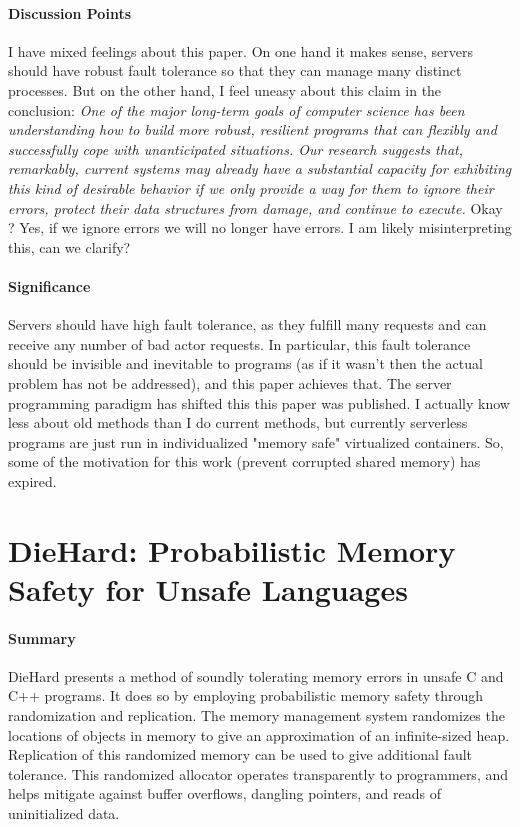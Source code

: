\paragraph{\textbf{Discussion Points}}
I have mixed feelings about this paper. On one hand it makes sense, servers
should have robust fault tolerance so that they can manage many distinct
processes. But on the other hand, I feel uneasy about this claim in the
conclusion:
\textit{One of the major long-term goals of computer science has been
understanding how to build more robust, resilient programs that can flexibly and
successfully cope with unanticipated situations. Our research suggests that,
remarkably, current systems may already have a substantial capacity for
exhibiting this kind of desirable behavior if we only provide a way for them to
ignore their errors, protect their data structures from damage, and continue
to execute.}
Okay ? Yes, if we ignore errors we will no longer have errors. I am likely
misinterpreting this, can we clarify?

\paragraph{\textbf{Significance}}
Servers should have high fault tolerance, as they fulfill many requests and can
receive any number of bad actor requests. In particular, this fault tolerance
should be invisible and inevitable to programs (as if it wasn't then the actual
problem has not be addressed), and this paper achieves that. The server
programming paradigm has shifted this this paper was published. I actually know
less about old methods than I do current methods, but currently serverless
programs are just run in individualized "memory safe" virtualized containers.
So, some of the motivation for this work (prevent corrupted shared memory) has
expired.

\section {DieHard: Probabilistic Memory Safety for Unsafe Languages \cite{berger2006diehard}}

\paragraph{\textbf{Summary}}
DieHard presents a method of soundly tolerating memory errors in unsafe C and
C++ programs. It does so by employing probabilistic memory safety through
randomization and replication. The memory management system randomizes the
locations of objects in memory to give an approximation of an infinite-sized
heap. Replication of this randomized memory can be used to give additional fault
tolerance. This randomized allocator operates transparently to programmers, and
helps mitigate against buffer overflows, dangling pointers, and reads of
uninitialized data.

